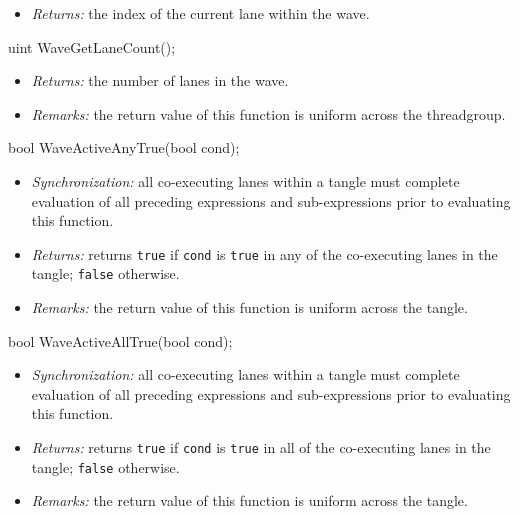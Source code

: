 \begin{itemize}
  \item \textit{Returns:} the index of the current \gls{lane} within the \gls{wave}.
\end{itemize}

\begin{HLSL}
uint WaveGetLaneCount();
\end{HLSL}

\begin{itemize}
  \item \textit{Returns:} the number of \gls{lane}s in the \gls{wave}.
  \item \textit{Remarks:} the return value of this function is uniform across
  the \gls{threadgroup}.
\end{itemize}

\begin{HLSL}
bool WaveActiveAnyTrue(bool cond);
\end{HLSL}

\begin{itemize}
  \item \textit{Synchronization:} all co-executing \gls{lane}s within a \gls{tangle}
  must complete evaluation of all preceding expressions and sub-expressions
  prior to evaluating this function.
  \item \textit{Returns:} returns \texttt{true} if \texttt{cond} is
  \texttt{true} in any of the co-executing \gls{lane}s in the \gls{tangle};
  \texttt{false} otherwise.
  \item \textit{Remarks:} the return value of this function is uniform across
  the \gls{tangle}.
\end{itemize}

\begin{HLSL}
bool WaveActiveAllTrue(bool cond);
\end{HLSL}

\begin{itemize}
  \item \textit{Synchronization:} all co-executing \gls{lane}s within a \gls{tangle}
  must complete evaluation of all preceding expressions and sub-expressions
  prior to evaluating this function.
  \item \textit{Returns:} returns \texttt{true} if \texttt{cond} is
  \texttt{true} in all of the co-executing \gls{lane}s in the \gls{tangle};
  \texttt{false} otherwise.
  \item \textit{Remarks:} the return value of this function is uniform across
  the \gls{tangle}.
\end{itemize}

